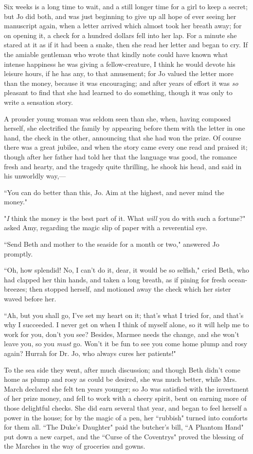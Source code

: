 Six weeks is a long time to wait, and a still longer time for a girl to
keep a secret; but Jo did both, and was just beginning to give up all
hope of ever seeing her manuscript again, when a letter arrived which
almost took her breath away; for on opening it, a check for a hundred
dollars fell into her lap. For a minute she stared at it as if it had
been a snake, then she read her letter and began to cry. If the amiable
gentleman who wrote that kindly note could have known what intense
happiness he was giving a fellow-creature, I think he would devote his
leisure hours, if he has any, to that amusement; for Jo valued the
letter more than the money, because it was encouraging; and after years
of effort it was \emph{so} pleasant to find that she had learned to do
something, though it was only to write a sensation story.

A prouder young woman was seldom seen than she, when, having composed
herself, she electrified the family by appearing before them with the
letter in one hand, the check in the other, announcing that she had won
the prize. Of course there was a great jubilee, and when the story came
every one read and praised it; though after her father had told her that
the language was good, the romance fresh and hearty, and the tragedy
quite thrilling, he shook his head, and said in his unworldly way,---

``You can do better than this, Jo. Aim at the highest, and never mind the
money."

"\emph{I} think the money is the best part of it. What \emph{will} you
do with such a fortune?" asked Amy, regarding the magic slip of paper
with a reverential eye.

``Send Beth and mother to the seaside for a month or two," answered Jo
promptly.

``Oh, how splendid! No, I can't do it, dear, it would be
so selfish," cried Beth, who had clapped her thin hands, and taken a
long breath, as if pining for fresh ocean-breezes; then stopped herself,
and motioned away the check which her sister waved before her.

``Ah, but you shall go, I've set my heart on it;
that's what I tried for, and that's why
I succeeded. I never get on when I think of myself alone, so it will
help me to work for you, don't you see? Besides, Marmee
needs the change, and she won't leave you, so you
\emph{must} go. Won't it be fun to see you come home
plump and rosy again? Hurrah for Dr. Jo, who always cures her patients!"

To the sea side they went, after much discussion; and though Beth
didn't come home as plump and rosy as could be desired,
she was much better, while Mrs. March declared she felt ten years
younger; so Jo was satisfied with the investment of her prize money, and
fell to work with a cheery spirit, bent on earning more of those
delightful checks. She did earn several that year, and began to feel
herself a power in the house; for by the magic of a pen, her ``rubbish"
turned into comforts for them all. ``The Duke's Daughter"
paid the butcher's bill, ``A Phantom Hand" put down a new
carpet, and the ``Curse of the Coventrys" proved the blessing of the
Marches in the way of groceries and gowns.

